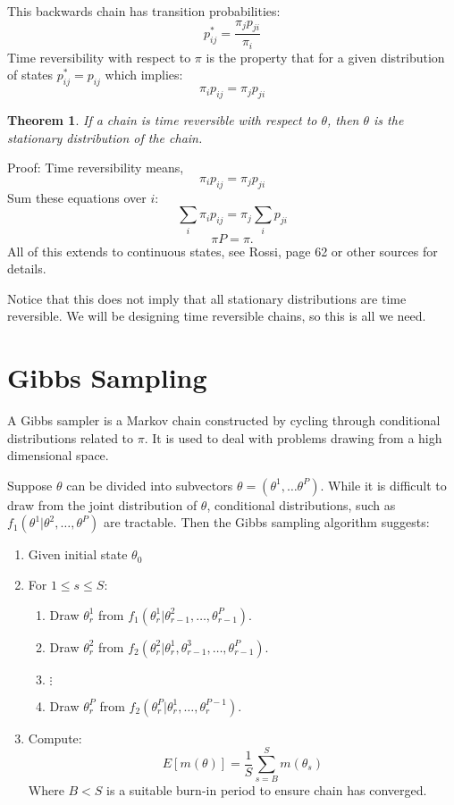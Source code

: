 \documentclass[twoside]{article}
\newcounter{lecnum}
\newtheorem{theorem}{Theorem}[lecnum]
\begin{document}
This backwards chain has transition probabilities: 
$$p^*_{ij} = \frac{\pi_j p_{ji}}{\pi_i}$$
Time reversibility with respect to $\pi$ is the property that for a given distribution of states $p^*_{ij} = p_{ij}$ which implies: 
$$\pi_i p_{ij} = \pi_j p_{ji}$$

\begin{theorem}
If a chain is time reversible with respect to $\theta$, then $\theta$ is the stationary distribution of the chain. 
\end{theorem}

Proof: 
Time reversibility means,
$$\pi_i p_{ij} = \pi_j p_{ji}$$
Sum these equations over $i$:
$$\sum_i \pi_i p_{ij} = \pi_j \sum_i p_{ji}$$
$$ \pi P = \pi.$$ 
All of this extends to continuous states, see Rossi, page 62 or other sources for details. 

Notice that this does not imply that all stationary distributions are time reversible. We will be designing time reversible chains, so this is all we need. 

\section{Gibbs Sampling}

A Gibbs sampler is a Markov chain constructed by cycling through conditional distributions related to $\pi$. It is used to deal with problems drawing from 
a high dimensional space. 

Suppose $\theta$ can be divided into subvectors $\theta = (\theta^1, \ldots \theta^P)$. While it is difficult to draw from 
the joint distribution of $\theta$, conditional distributions, such as $f_1(\theta^1| \theta^2, \ldots, \theta^P)$ are tractable. 
Then the Gibbs sampling algorithm suggests: 

\begin{enumerate}
\item Given initial state $\theta_0$
\item For $1 \leq s \leq S$:
\begin{enumerate}
\item Draw $\theta^1_r$ from $f_1( \theta^1_r |  \theta^2_{r-1}, \ldots, \theta^P_{r-1})$. 
\item Draw $\theta^2_r$ from $f_2( \theta^2_r |  \theta^1_r, \theta^3_{r-1}, \ldots, \theta^P_{r-1})$. 
\item $\vdots$
\item Draw $\theta^P_r$ from $f_2( \theta^P_r |  \theta^1_r, \ldots, \theta^{P-1}_{r})$.
\end{enumerate}
\item Compute:
$$ E[m(\theta)] = \frac{1}{S} \sum_{s = B}^S m(\theta_s) $$
Where $B < S$ is a suitable burn-in period to ensure chain has converged. 
\end{enumerate}
\end{document}
